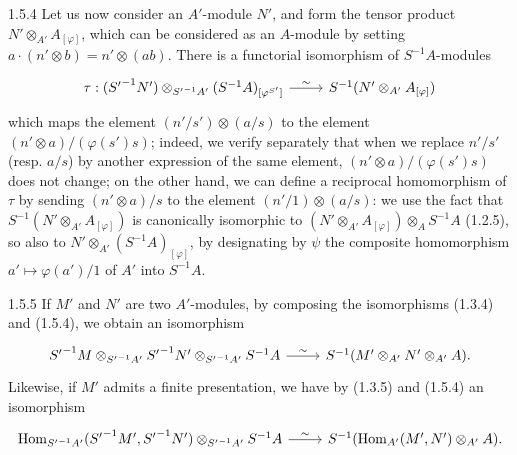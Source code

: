 \documentclass[../main.tex]{subfiles}
\begin{document}
\begin{cx}{1.5.4}
Let us now consider an $A'$-module $N'$, and form the tensor product $N'\otimes_{A'}A_{[\varphi]}$,
which can be considered as an $A$-module by setting $a\cdot(n'\otimes b)=n'\otimes(ab)$. There is a
functorial isomorphism of $S^{-1}A$-modules
\[\begin{tikzcd}
  \tau:({S'}^{-1}N')\otimes_{{S'}^{-1}A'}(S^{-1}A)_{[\varphi^{S'}]}\ar[r,"\sim"] &
  S^{-1}(N'\otimes_{A'}A_{[\varphi]})
\end{tikzcd}\]
which maps the element $(n'/s')\otimes(a/s)$ to the element $(n'\otimes a)/(\varphi(s')s)$;
indeed, we verify separately that when we replace $n'/s'$ (resp. $a/s$) by another expression of the
same element, $(n'\otimes a)/(\varphi(s')s)$ does not change; on the other hand, we can define a
reciprocal homomorphism of $\tau$ by sending $(n'\otimes a)/s$ to the element $(n'/1)\otimes(a/s)$:
we use the fact that $S^{-1}(N'\otimes_{A'}A_{[\varphi]})$ is canonically isomorphic to
$(N'\otimes_{A'}A_{[\varphi]})\otimes_A S^{-1}A$ (1.2.5), so also to $N'\otimes_{A'}(S^{-1}A)_{[\varphi]}$,
by designating by $\psi$ the composite homomorphism $a'\mapsto\varphi(a')/1$ of $A'$ into $S^{-1}A$.
\end{cx}

\begin{cx}{1.5.5}
If $M'$ and $N'$ are two $A'$-modules, by composing the isomorphisms (1.3.4) and (1.5.4), we obtain
an isomorphism
\[\begin{tikzcd}
  {S'}^{-1}M\otimes_{{S'}^{-1}A'}{S'}^{-1}N'\otimes_{{S'}^{-1}A'}S^{-1}A\ar[r,"\sim"] &
  S^{-1}(M'\otimes_{A'}N'\otimes_{A'}A).
\end{tikzcd}\]
Likewise, if $M'$ admits a finite presentation, we have by (1.3.5) and (1.5.4) an isomorphism
\[\begin{tikzcd}
  \Hom_{{S'}^{-1}A'}({S'}^{-1}M',{S'}^{-1}N')\otimes_{{S'}^{-1}A'}S^{-1}A\ar[r,"\sim"] &
  S^{-1}(\Hom_{A'}(M',N')\otimes_{A'}A).
\end{tikzcd}\]
\end{cx}
\end{document}
